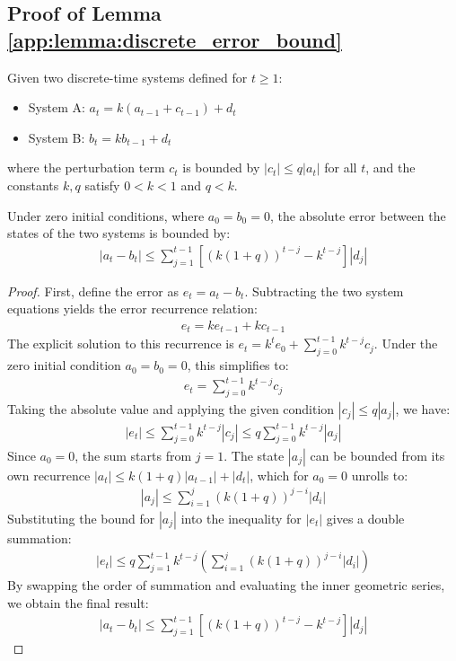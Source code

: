 \documentclass[11pt, letterpaper]{article}
\begin{document}
\subsection{Proof of Lemma \ref{app:lemma:discrete_error_bound}}
\begin{lemma}
\label{app:lemma:discrete_error_bound}
Given two discrete-time systems defined for \( t \ge 1 \):
\begin{itemize}
    \item System A: \( a_{t}=k(a_{t-1}+c_{t-1})+d_{t} \)
    \item System B: \( b_{t}=kb_{t-1}+d_{t} \)
\end{itemize}
where the perturbation term \( c_t \) is bounded by \( |c_{t}|\le q|a_{t}| \) for all \( t \), and the constants \( k, q \) satisfy \( 0<k<1 \) and \( q<k \).

Under zero initial conditions, where \( a_0 = b_0 = 0 \), the absolute error between the states of the two systems is bounded by:
\begin{align}
    |a_{t}-b_{t}|\le\sum_{j=1}^{t-1}\left[(k(1+q))^{t-j}-k^{t-j}\right]|d_{j}|
\end{align}
\end{lemma}
\begin{proof}
First, define the error as \( e_t = a_t - b_t \). Subtracting the two system equations yields the error recurrence relation:
\begin{align}
    e_{t} = ke_{t-1} + kc_{t-1}
\end{align}
The explicit solution to this recurrence is \( e_{t} = k^{t}e_{0} + \sum_{j=0}^{t-1}k^{t-j}c_{j} \). Under the zero initial condition \( a_0 = b_0 = 0 \), this simplifies to:
\begin{align}
    e_{t} = \sum_{j=0}^{t-1}k^{t-j}c_{j}
\end{align}
Taking the absolute value and applying the given condition \( |c_j| \le q|a_j| \), we have:
\begin{align}
    |e_{t}| \le \sum_{j=0}^{t-1}k^{t-j}|c_{j}| \le q\sum_{j=0}^{t-1}k^{t-j}|a_{j}|
\end{align}
Since \( a_0=0 \), the sum starts from \( j=1 \). The state \( |a_j| \) can be bounded from its own recurrence \( |a_{t}| \le k(1+q)|a_{t-1}| + |d_t| \), which for \( a_0=0 \) unrolls to:
\begin{align}
    |a_{j}|\le\sum_{i=1}^{j}(k(1+q))^{j-i}|d_{i}|
\end{align}
Substituting the bound for \( |a_j| \) into the inequality for \( |e_t| \) gives a double summation:
\begin{align}
    |e_{t}|\le q\sum_{j=1}^{t-1}k^{t-j}\left(\sum_{i=1}^{j}(k(1+q))^{j-i}|d_{i}|\right)
\end{align}
By swapping the order of summation and evaluating the inner geometric series, we obtain the final result:
\begin{align}
    |a_{t}-b_{t}| \le \sum_{j=1}^{t-1}\left[(k(1+q))^{t-j}-k^{t-j}\right]|d_{j}|
\end{align}
\end{proof}
\end{document}

